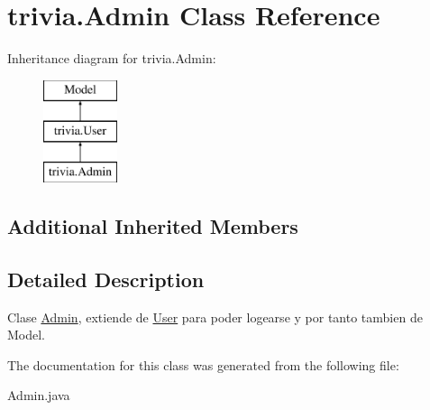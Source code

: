 \hypertarget{classtrivia_1_1Admin}{}\section{trivia.\+Admin Class Reference}
\label{classtrivia_1_1Admin}
Inheritance diagram for trivia.\+Admin\+:\begin{figure}[H]
\begin{center}
\leavevmode
\includegraphics[height=3.000000cm]{classtrivia_1_1Admin}
\end{center}
\end{figure}
\subsection*{Additional Inherited Members}


\subsection{Detailed Description}
Clase \mbox{\hyperlink{classtrivia_1_1Admin}{Admin}}, extiende de \mbox{\hyperlink{classtrivia_1_1User}{User}} para poder logearse y por tanto tambien de Model. 

The documentation for this class was generated from the following file\+:\begin{DoxyCompactItemize}
\item 
Admin.\+java\end{DoxyCompactItemize}
